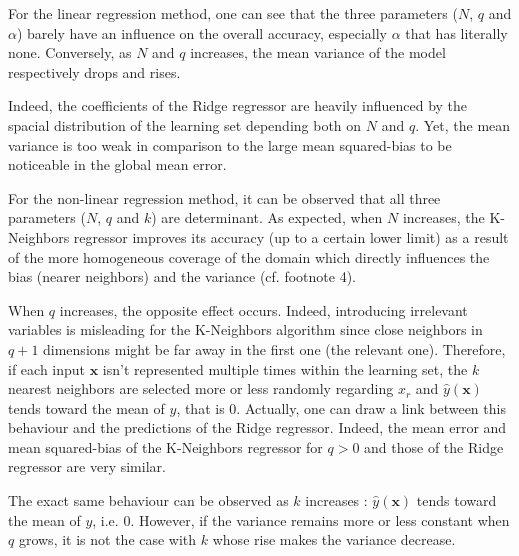 \documentclass[a4paper, 12pt]{article}
\begin{document}
\begin{enumerate}[label=(\alph*)]
        For the linear regression method, one can see that the three parameters ($N$, $q$ and $\alpha$) barely have an influence on the overall accuracy, especially $\alpha$ that has literally none. Conversely, as $N$ and $q$ increases, the mean variance of the model respectively drops and rises.
        
        Indeed, the coefficients of the Ridge regressor are heavily influenced by the spacial distribution of the learning set depending both on $N$ and $q$. Yet, the mean variance is too weak in comparison to the large mean squared-bias to be noticeable in the global mean error.
        
        For the non-linear regression method, it can be observed that all three parameters ($N$, $q$ and $k$) are determinant. As expected, when $N$ increases, the K-Neighbors regressor improves its accuracy (up to a certain lower limit) as a result of the more homogeneous coverage of the domain which directly influences the bias (nearer neighbors) and the variance (cf. footnote 4).
        
        When $q$ increases, the opposite effect occurs. Indeed, introducing irrelevant variables is misleading for the K-Neighbors algorithm since close neighbors in $q + 1$ dimensions might be far away in the first one (the relevant one). Therefore, if each input $\bm{x}$ isn't represented multiple times within the learning set, the $k$ nearest neighbors are selected more or less randomly regarding $x_r$ and $\hat{y}(\bm{x})$ tends toward the mean of $y$, that is $0$. Actually, one can draw a link between this behaviour and the predictions of the Ridge regressor. Indeed, the mean error and mean squared-bias of the K-Neighbors regressor for $q > 0$ and those of the Ridge regressor are very similar.
        
        The exact same behaviour can be observed as $k$ increases : $\hat{y}(\bm{x})$ tends toward the mean of $y$, i.e. $0$. However, if the variance remains more or less constant when $q$ grows, it is not the case with $k$ whose rise makes the variance decrease. 
    \end{enumerate}
\end{document}
